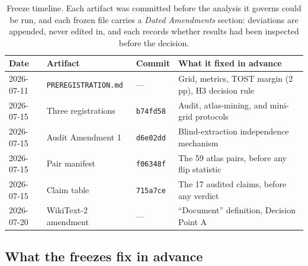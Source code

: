 \begin{table}[!t]
\centering
\small
\caption{Freeze timeline. Each artifact was committed before the analysis it
governs could be run, and each frozen file carries a \emph{Dated Amendments}
section: deviations are appended, never edited in, and each records whether
results had been inspected before the decision.}
\label{tab:freeze-timeline}
\setlength{\tabcolsep}{4pt}
\small
\begin{tabular}{lll>{\raggedright\arraybackslash}p{4.6cm}}
\toprule
Date & Artifact & Commit & What it fixed in advance \\
\midrule
2026-07-11 & \texttt{PREREGISTRATION.md} & --- & Grid, metrics, TOST margin (2\,pp), H3 decision rule \\
2026-07-15 & Three registrations & \texttt{b74fd58} & Audit, atlas-mining, and mini-grid protocols \\
2026-07-15 & Audit Amendment 1 & \texttt{d6e02dd} & Blind-extraction independence mechanism \\
2026-07-15 & Pair manifest & \texttt{f06348f} & The 59 atlas pairs, before any flip statistic \\
2026-07-15 & Claim table & \texttt{715a7ce} & The 17 audited claims, before any verdict \\
2026-07-20 & WikiText-2 amendment & --- & ``Document'' definition, Decision Point A \\
\bottomrule
\end{tabular}
\end{table}

\subsection{What the freezes fix in advance}
\label{app:prereg:whatfixed}

